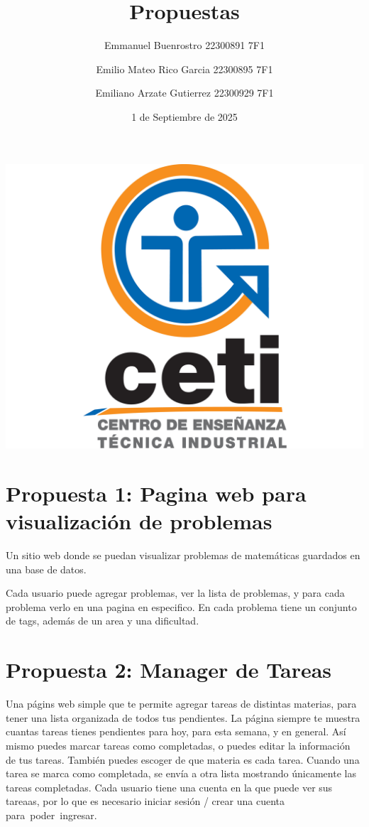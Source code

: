 \documentclass[11pt]{scrartcl}
\title {Propuestas}
\date{1 de Septiembre de 2025}
\author{Emmanuel Buenrostro 22300891 7F1 \\ \and Emilio Mateo Rico Garcia 22300895 7F1 \\ \and Emiliano Arzate Gutierrez 22300929 7F1}
\begin{document}
\maketitle
\begin{center}
   \includegraphics[scale=0.15]{../../cetilogo.jpg} 
\end{center}
\newpage

\section{Propuesta 1: Pagina web para visualización de problemas}

Un sitio web donde se puedan visualizar problemas de matemáticas guardados en una base de datos. 

Cada usuario puede agregar problemas, ver la lista de problemas, y para cada problema verlo en una pagina en especifico. 
En cada problema tiene un conjunto de tags, además de un area y una dificultad.





\newpage

\section{Propuesta 2: Manager de Tareas}

Una págins web simple que te permite agregar tareas de distintas materias, para tener una lista organizada de todos tus pendientes. La página siempre te muestra cuantas tareas tienes pendientes para hoy, para esta semana, y en general. Así mismo puedes marcar tareas como completadas, o puedes editar la información de tus tareas. También puedes escoger de que materia es cada tarea. Cuando una tarea se marca como completada, se envía a otra lista mostrando únicamente las tareas completadas. Cada usuario tiene una cuenta en la que puede ver sus tareaas, por lo que es necesario iniciar sesión / crear una cuenta para poder ingresar.
\end{document}
